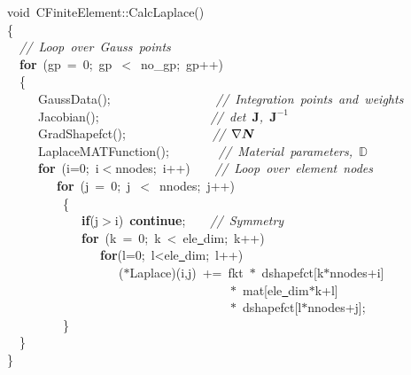 {\ttfamily \raggedright \small
void\ CFiniteElement::CalcLaplace()\\
\{\\
\ \ \textsl{//\ Loop\ over\ Gauss\ points}\\
\ \ \textbf{for}\ (gp\ =\ 0;\ gp\ $<${}\ no\_gp;\ gp++)\\
\ \ \{\\
\mbox{\ \ \ \ \ GaussData();\ \ \ \ \ \ \ \ \ \ \ \ \ \ \ \ \ \textsl{//\ Integration\ points\ and\ weights}}\\
\mbox{\ \ \ \ \ Jacobian();\ \ \ \ \ \ \ \ \ \ \ \  \ \ \ \ \ \ \textsl{//\ det\ $\mathbf{J}$,\ ${\mathbf J}^{-1}$}}\\
\ \ \ \ \ GradShapefct();\ \ \ \ \ \  \ \ \ \ \ \ \ \ \textsl{//\ $\nabla \bm N$}\\
\mbox{\ \ \ \ \ LaplaceMATFunction();\ \ \ \ \ \ \ \ \textsl{//\ Material\ parameters,\ $\mathbb{D}$}}\\
\mbox{\ \ \ \ \ \textbf{for}\ (i=0;\ i$<${}nnodes;\ i++)\ \ \ \ \textsl{//\ Loop\ over\ element\ nodes}}\\
\ \ \ \ \ \ \ \ \textbf{for}\ (j\ =\ 0;\ j\ $<${}\ nnodes;\ j++)\\
\ \ \ \ \ \ \ \ \ \{\\
\mbox{\ \ \ \ \ \ \ \ \ \ \ \ \textbf{if}(j$>${}i)\ \textbf{continue};\ \ \ \ \textsl{//\ Symmetry}}\\
\mbox{\ \ \ \ \ \ \ \ \ \ \ \ \textbf{for}\ (k\ =\ 0;\ k\ <{}\ ele\underline\ dim;\ k++)}\\
\mbox{\ \ \ \ \ \ \ \ \ \ \ \ \ \ \ \textbf{for}(l=0;\ l<{}ele\underline\ dim;\ l++)}\\
\mbox{\ \ \ \ \ \ \ \ \ \ \ \ \ \ \ \ \ \ ($\ast$Laplace)(i,j)\ +=\ fkt\ $\ast$\ dshapefct[k$\ast$nnodes+i]\ }\\
\mbox{\ \ \ \ \ \ \ \ \ \ \ \ \ \ \ \ \ \ \ \ \ \ \ \ \ \ \ \ \ \ \ \ \ \ \ \ $\ast$\ mat[ele\underline\ dim$\ast$k+l]\ }\\
\mbox{\ \ \ \ \ \ \ \ \ \ \ \ \ \ \ \ \ \ \ \ \ \ \ \ \ \ \ \ \ \ \ \ \ \ \ \ $\ast$\ dshapefct[l$\ast$nnodes+j];}\\
\ \ \ \ \ \ \ \ \ \}\\
\ \ \}\\
\}\\
\ \\
 }
\normalfont\normalsize

